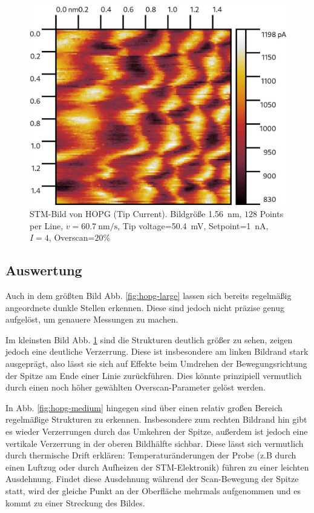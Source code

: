 \documentclass{article}
\begin{document}
\begin{figure}[h]
    \centering
    \includegraphics[width=0.5\linewidth]{hopg-small}
    \caption{
        STM-Bild von HOPG (Tip Current). Bildgröße \SI{1.56}{\nm}, $128$ Points per Line,
        $v=\SI{60.7}{\nm\per\s}$, Tip voltage=\SI{50.4}{\mV}, Setpoint=\SI{1}{\nA}, $I=4$, Overscan=$20\%$
    }
    \label{fig:hopg-small}
\end{figure}


\subsection{Auswertung}
Auch in dem größten Bild Abb. \ref{fig:hopg-large} lassen sich bereits regelmäßig angeordnete dunkle Stellen erkennen.
Diese sind jedoch nicht präzise genug aufgelöst, um genauere Messungen zu machen.

Im kleinsten Bild Abb. \ref{fig:hopg-small} sind die Strukturen deutlich größer zu sehen, zeigen jedoch eine deutliche Verzerrung.
Diese ist insbesondere am linken Bildrand stark ausgeprägt, also lässt sie sich auf Effekte beim Umdrehen der Bewegungsrichtung der
Spitze am Ende einer Linie zurückführen. Dies könnte prinzipiell vermutlich durch einen noch höher gewählten Overscan-Parameter
gelöst werden.

In Abb. \ref{fig:hopg-medium} hingegen sind über einen relativ großen Bereich regelmäßige Strukturen zu erkennen.
Insbesondere zum rechten Bildrand hin gibt es wieder Verzerrungen durch das Umkehren der Spitze, außerdem ist
jedoch eine vertikale Verzerrung in der oberen Bildhälfte sichbar. Diese lässt sich vermutlich durch thermische Drift erklären:
Temperaturänderungen der Probe (z.B durch einen Luftzug oder durch Aufheizen der STM-Elektronik) führen zu einer leichten Ausdehnung.
Findet diese Ausdehnung während der Scan-Bewegung der Spitze statt, wird der gleiche Punkt an der Oberfläche mehrmals aufgenommen
und es kommt zu einer Streckung des Bildes.
\end{document}
